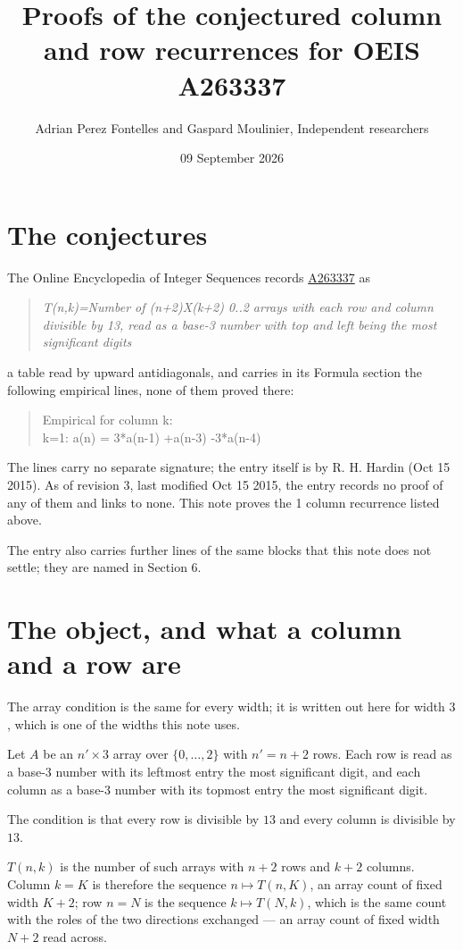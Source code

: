 \documentclass[11pt]{article}
\title{Proofs of the conjectured column and row recurrences for OEIS A263337}
\author{Adrian Perez Fontelles and Gaspard Moulinier, Independent researchers}
\date{09 September 2026}
\theoremstyle{definition}
\begin{document}
\maketitle
\section{The conjectures}

The Online Encyclopedia of Integer Sequences records \href{https://oeis.org/A263337}{A263337} as

\begin{quote}\itshape T(n,k)=Number of (n+2)X(k+2) 0..2 arrays with each row and column divisible by 13, read as a base-3 number with top and left being the most significant digits\end{quote}

a table read by upward antidiagonals, and carries in its Formula section the following empirical lines, none of them proved there:

\begin{quote}\ttfamily Empirical for column k:\\
k=1: a(n) = 3*a(n-1) +a(n-3) -3*a(n-4)\end{quote}

The lines carry no separate signature; the entry itself is by R. H. Hardin (Oct 15 2015). As of revision 3, last modified Oct 15 2015, the entry records no proof of any of them and links to none. This note proves the 1 column recurrence listed above.

The entry also carries further lines of the same blocks that this note does not settle; they are named in Section 6.

\section{The object, and what a column and a row are}

The array condition is the same for every width; it is written out here for width $3$, which is one of the widths this note uses.

Let $A$ be an $n' \times 3$ array over $\{0,\dots,2\}$ with $n' = n + 2$ rows. Each row is read as a base-$3$ number with its leftmost entry the most significant digit, and each column as a base-$3$ number with its topmost entry the most significant digit.

The condition is that every row is divisible by $13$ and every column is divisible by $13$.

$T(n,k)$ is the number of such arrays with $n + 2$ rows and $k + 2$ columns. Column $k = K$ is therefore the sequence $n \mapsto T(n,K)$, an array count of fixed width $K + 2$; row $n = N$ is the sequence $k \mapsto T(N,k)$, which is the same count with the roles of the two directions exchanged --- an array count of fixed width $N + 2$ read across.
\end{document}
